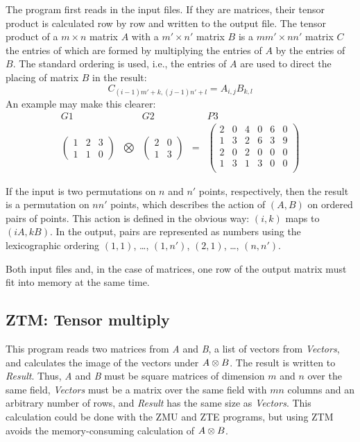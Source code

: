 The program first reads in the input files. If they are matrices,
their tensor product is calculated row by row and written to the
output file. The tensor product of a $m\times n$ matrix $A$ with
a $m'\times n'$ matrix $B$ is a $mm'\times nn'$ matrix $C$ the entries
of which are formed by multiplying the entries of $A$ by the entries
of $B$. The standard ordering is used, i.e., the entries of $A$ are
used to direct the placing of matrix $B$ in the result:
\[
	C_{(i-1)m'+k,(j-1)n'+l} = A_{i,j} B_{k,l}
\]
An example may make this clearer:
\[	\begin{array}{ccccc}
	G1 & & G2 & & P3 \\
	\left(\begin{array}{ccc}1&2&3\\1&1&0\end{array}\right) &
	\bigotimes &
	\left(\begin{array}{cc}2&0\\1&3\end{array}\right) & = &
	\left(\begin{array}{cccccc}
		2 & 0 & 4 & 0 & 6 & 0\\
		1 & 3 & 2 & 6 & 3 & 9\\
		2 & 0 & 2 & 0 & 0 & 0\\
		1 & 3 & 1 & 3 & 0 & 0\\
	\end{array}\right)
	\end{array}
\]

If the input is two permutations on $n$ and $n'$ points, respectively,
then the result is a permutation on $nn'$ points, which describes
the action of $(A,B)$ on ordered pairs of points. This action
is defined in the obvious way: $(i,k)$ maps to $(iA,kB)$. In the
output, pairs are represented as numbers using the lexicographic
ordering $(1,1)$, \ldots, $(1,n')$, $(2,1)$, \ldots, $(n,n')$.

\Limits
Both input files and, in the case of matrices, one row of the output
matrix must fit into memory at the same time.


\subsection{ZTM: Tensor multiply}
\Syntax
{}

\Description
This program reads two matrices from {\it A} and {\it B}, a list of
vectors from {\it Vectors}, and calculates the image of the vectors
under $A\otimes B$. The result is written to {\it Result}. Thus,
{\it A} and {\it B} must be square matrices of dimension $m$
and $n$ over the same field, {\it Vectors} must be a matrix over the
same field with $mn$ columns and an arbitrary number of rows, and
{\it Result} has the same size as {\it Vectors}.
This calculation could be done with the ZMU and ZTE programs, but using
ZTM avoids the memory-consuming calculation of $A\otimes B$.


